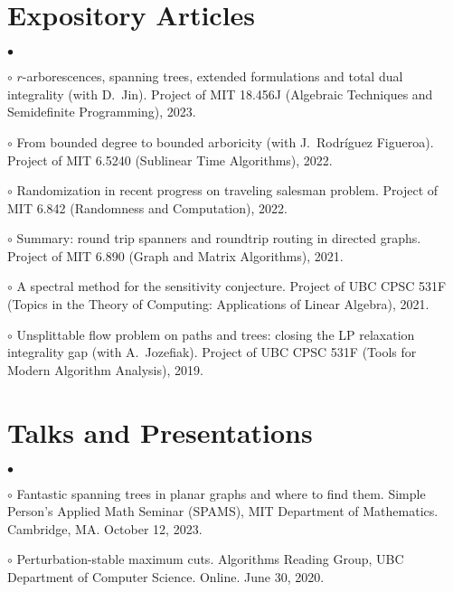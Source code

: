 \documentclass[margin,line]{res}
\newenvironment{list2}{
  \begin{list}{$\bullet$}{%
      \setlength{\itemsep}{0in}
      \setlength{\parsep}{0in} \setlength{\parskip}{0in}
      \setlength{\topsep}{0in} \setlength{\partopsep}{0in}
      \setlength{\leftmargin}{0.2in}}}{\end{list}}
\begin{document}
\begin{resume}
\section{\sc Expository Articles}

\begin{list2}
\item[$\circ$] $r$-arborescences, spanning trees, extended formulations and total dual integrality (with D.\ Jin). Project of MIT 18.456J (Algebraic Techniques and Semidefinite Programming), 2023.
\item[$\circ$] From bounded degree to bounded arboricity (with J.\ Rodríguez Figueroa). Project of MIT 6.5240 (Sublinear Time Algorithms), 2022.
\item[$\circ$] Randomization in recent progress on traveling salesman problem. Project of MIT 6.842 (Randomness and Computation), 2022.
\item[$\circ$] Summary: round trip spanners and roundtrip routing in directed graphs. Project of MIT 6.890 (Graph and Matrix Algorithms), 2021.
\item[$\circ$] A spectral method for the sensitivity conjecture. Project of UBC CPSC 531F (Topics in the Theory of Computing: Applications of Linear Algebra), 2021.
\item[$\circ$] Unsplittable flow problem on paths and trees: closing the LP relaxation integrality gap (with A.\ Jozefiak). Project of UBC CPSC 531F (Tools for Modern Algorithm Analysis), 2019. %
\end{list2}

\section{\sc Talks and Presentations}

\begin{list2}
\item[$\circ$] Fantastic spanning trees in planar graphs and where to find them. Simple Person's Applied Math Seminar (SPAMS), MIT Department of Mathematics. Cambridge, MA. October 12, 2023.
\item[$\circ$] Perturbation-stable maximum cuts. Algorithms Reading Group, UBC Department of Computer Science. Online. June 30, 2020.
\end{list2}




\end{resume}
\end{document}
